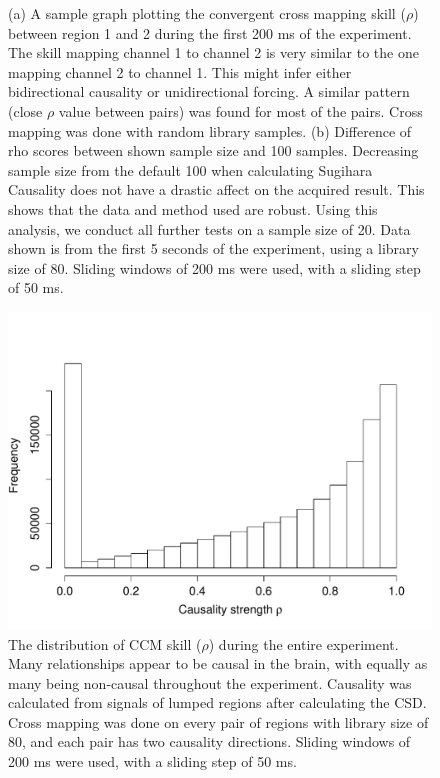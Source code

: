 \documentclass[journal,12pt,onecolumn,draftclsnofoot]{IEEEtran}  %
\begin{document}
\begin{figure}[H]
  \caption{(a) A sample graph plotting the convergent cross mapping skill ($\rho$) between region 1 and 2 during the first 200 ms of the experiment. The skill mapping channel 1 to channel 2 is very similar to the one mapping channel 2 to channel 1. This might infer either bidirectional causality or unidirectional forcing. A similar pattern (close $\rho$ value between pairs) was found for most of the pairs. Cross mapping was done with random library samples. (b) Difference of rho scores between shown sample size and 100 samples. Decreasing sample size from the default 100 when calculating Sugihara Causality does not have a drastic affect on the acquired result. This shows that the data and method used are robust. Using this analysis, we conduct all further tests on a sample size of 20. Data shown is from the first 5 seconds of the experiment, using a library size of 80. Sliding windows of 200 ms were used, with a sliding step of 50 ms.}
\end{figure}

\begin{figure}[H]
	\centering
	\includegraphics[width=0.6\linewidth]{figures/rho_hist_all_experiment.pdf}
	\caption{The distribution of CCM skill ($\rho$) during the entire experiment. Many relationships appear to be causal in the brain, with equally as many being non-causal throughout the experiment. Causality was calculated from signals of lumped regions after calculating the CSD. Cross mapping was done on every pair of regions with library size of 80, and each pair has two causality directions. Sliding windows of 200 ms were used, with a sliding step of 50 ms.}
	\label{fig:rho_hist_all_experiment}
\end{figure}
\end{document}
